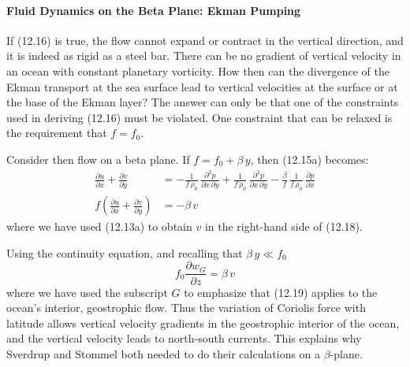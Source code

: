 \paragraph{Fluid Dynamics on the Beta Plane: Ekman Pumping}
If (12.16) is true,
the flow cannot expand or contract in the vertical direction, and it
is indeed as rigid as a steel bar. There can be no gradient of
vertical velocity in an ocean with constant planetary vorticity. How
then can the divergence of the Ekman transport
at the sea surface lead to vertical velocities at the surface or at
the base of the Ekman layer? The answer can only be that one of the
constraints used in deriving (12.16) must be violated. One constraint
that can be relaxed is the requirement that $f = f_0$.

Consider then flow on a beta plane. If $f = f_0 + \beta\,y$, then
(12.15a) becomes:
\begin{align}
\frac{\partial{u}}{\partial{x}} + \frac{\partial{v}}{\partial{y}} &= - \frac{1}{f\,\rho_{0}}\, \frac{\partial ^2 p}{\partial{x}\,\partial{y}} +
\frac{1}{f\,\rho_{0}} \, \frac{\partial ^2 p}{\partial{x}\,\partial{y}} - \frac{\beta}{f} \,\frac{1}{f\,\rho_{0}}\,\frac{\partial{p}}{\partial{x}} \\
f \left( \frac{\partial{u}}{\partial{x}} + \frac{\partial{v}}{\partial{y}} \right) &= - \beta \, v
\end{align}
where we have used (12.13a) to obtain $v$ in the right-hand side of (12.18).

Using the continuity equation, and recalling that $\beta\, y \ll f_0$
\begin{equation}
f_0 \frac{\partial{w_G}}{\partial{z}} = \beta \, v
\end{equation}
where we have used the subscript $G$ to emphasize that (12.19) applies
to the ocean's interior, geostrophic flow. Thus the variation of Coriolis force
with latitude allows vertical velocity gradients in the geostrophic
interior of the ocean, and the vertical velocity leads to north-south
currents.  This explains why Sverdrup and Stommel both needed to do
their calculations on a $\beta$-plane.


